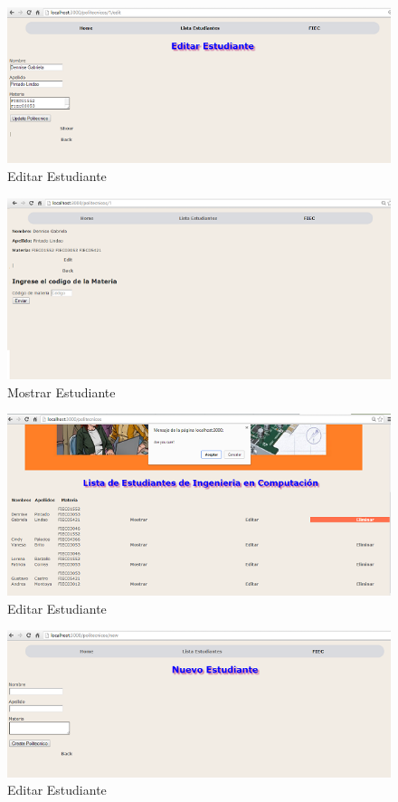 \begin{figure}
\centering
\includegraphics[scale=0.8]{imagenes/editar.png}
\caption{Editar Estudiante}
\label{fig: threadsVsSync}
\end{figure}

\begin{figure}
\centering
\includegraphics[scale=0.8]{imagenes/mostrar.png}
\caption{Mostrar Estudiante}
\label{fig: threadsVsSync}
\end{figure}

\begin{figure}
\centering
\includegraphics[scale=0.8]{imagenes/eliminar.png}
\caption{Editar Estudiante}
\label{fig: threadsVsSync}
\end{figure}

\begin{figure}
\centering
\includegraphics[scale=0.8]{imagenes/nuevo.png}
\caption{Editar Estudiante}
\label{fig: threadsVsSync}
\end{figure}


